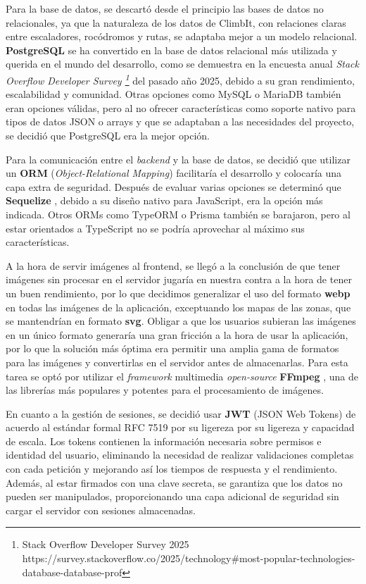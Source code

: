 Para la base de datos, se descartó desde el principio las bases de datos no relacionales, ya que la naturaleza de los datos de ClimbIt, con relaciones claras entre escaladores, rocódromos y rutas, se adaptaba mejor a un modelo relacional. \textbf{PostgreSQL} \citep{postgresql_db} se ha convertido en la base de datos relacional más utilizada y querida en el mundo del desarrollo, como se demuestra en la encuesta anual \textit{Stack Overflow Developer Survey \footnote{Stack Overflow Developer Survey 2025 https://survey.stackoverflow.co/2025/technology\#most-popular-technologies-database-database-prof}} del pasado año 2025, debido a su gran rendimiento, escalabilidad y comunidad. Otras opciones como MySQL o MariaDB también eran opciones válidas, pero al no ofrecer características como soporte nativo para tipos de datos JSON o arrays y que se adaptaban a las necesidades del proyecto, se decidió que PostgreSQL era la mejor opción.

Para la comunicación entre el \textit{backend} y la base de datos, se decidió que utilizar un \textbf{ORM} (\textit{Object-Relational Mapping}) facilitaría el desarrollo y colocaría una capa extra de seguridad. Después de evaluar varias opciones se determinó que \textbf{Sequelize} \citep{sequelize_orm}, debido a su diseño nativo para JavaScript, era la opción más indicada. Otros ORMs como TypeORM o Prisma también se barajaron, pero al estar orientados a TypeScript no se podría aprovechar al máximo sus características.

A la hora de servir imágenes al frontend, se llegó a la conclusión de que tener imágenes sin procesar en el servidor jugaría en nuestra contra a la hora de tener un buen rendimiento, por lo que decidimos generalizar el uso del formato \textbf{webp} en todas las imágenes de la aplicación, exceptuando los mapas de las zonas, que se mantendrían en formato \textbf{svg}. Obligar a que los usuarios subieran las imágenes en un único formato generaría una gran fricción a la hora de usar la aplicación, por lo que la solución más óptima era permitir una amplia gama de formatos para las imágenes y convertirlas en el servidor antes de almacenarlas. Para esta tarea se optó por utilizar el \textit{framework} multimedia \textit{open-source} \textbf{FFmpeg} \citep{ffmpeg_project}, una de las librerías más populares y potentes para el procesamiento de imágenes.

En cuanto a la gestión de sesiones, se decidió usar \textbf{JWT} (JSON Web Tokens) de acuerdo al estándar formal RFC 7519 \citep{rfc7519} por su ligereza por su ligereza y capacidad de escala. Los tokens contienen la información necesaria sobre permisos e identidad del usuario, eliminando la necesidad de realizar validaciones completas con cada petición y mejorando así los tiempos de respuesta y el rendimiento. Además, al estar firmados con una clave secreta, se garantiza que los datos no pueden ser manipulados, proporcionando una capa adicional de seguridad sin cargar el servidor con sesiones almacenadas.

